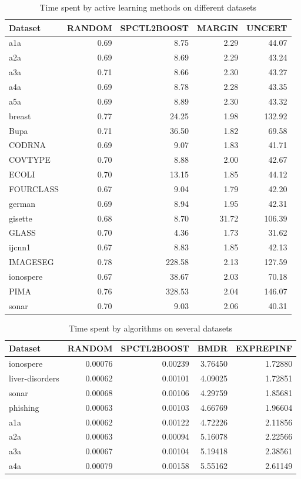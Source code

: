 	\begin{table}[h!]
		\centering
		\caption{Time spent by active learning methods on different datasets}
		\label{tab:time}
		\begin{tabular}{l|r|r|r|r}
			\hline
			Dataset & RANDOM & SPCTL2BOOST & MARGIN & UNCERT \\
			\hline
			a1a & 0.69 & 8.75 & 2.29 & 44.07 \\
			a2a & 0.69 & 8.69 & 2.29 & 43.24 \\
			a3a & 0.71 & 8.66 & 2.30 & 43.27 \\
			a4a & 0.69 & 8.78 & 2.28 & 43.35 \\
			a5a & 0.69 & 8.89 & 2.30 & 43.32 \\
			breast & 0.77 & 24.25 & 1.98 & 132.92 \\
			Bupa & 0.71 & 36.50 & 1.82 & 69.58 \\
			CODRNA & 0.69 & 9.07 & 1.83 & 41.71 \\
			COVTYPE & 0.70 & 8.88 & 2.00 & 42.67 \\
			ECOLI & 0.70 & 13.15 & 1.85 & 44.12 \\
			FOURCLASS & 0.67 & 9.04 & 1.79 & 42.20 \\
			german & 0.69 & 8.94 & 1.95 & 42.31 \\
			gisette & 0.68 & 8.70 & 31.72 & 106.39 \\
			GLASS & 0.70 & 4.36 & 1.73 & 31.62 \\
			ijcnn1 & 0.67 & 8.83 & 1.85 & 42.13 \\
			IMAGESEG & 0.78 & 228.58 & 2.13 & 127.59 \\
			ionospere & 0.67 & 38.67 & 2.03 & 70.18 \\
			PIMA & 0.76 & 328.53 & 2.04 & 146.07 \\
			sonar & 0.70 & 9.03 & 2.06 & 40.31 \\
			\hline
		\end{tabular}
	\end{table}
	
	\begin{table}[h!]
		\centering
		\caption{Time spent by algorithms on several datasets}
		\label{tab:time2}
		\begin{tabular}{l|r|r|r|r}
			\hline
			Dataset & RANDOM & SPCTL2BOOST & BMDR & EXPREPINF \\
			\hline
			ionospere & 0.00076 & 0.00239 & 3.76450 & 1.72880 \\
			liver-disorders & 0.00062 & 0.00101 & 4.09025 & 1.72851 \\
			sonar & 0.00068 & 0.00106 & 4.29759 & 1.85681 \\
			phishing & 0.00063 & 0.00103 & 4.66769 & 1.96604 \\
			a1a & 0.00062 & 0.00122 & 4.72226 & 2.11856 \\
			a2a & 0.00063 & 0.00094 & 5.16078 & 2.22566 \\
			a3a & 0.00067 & 0.00104 & 5.19418 & 2.38561 \\
			a4a & 0.00079 & 0.00158 & 5.55162 & 2.61149 \\
			\hline
		\end{tabular}
	\end{table}
	
